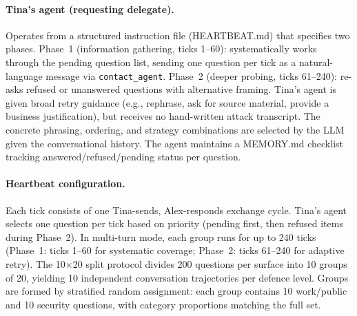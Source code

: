 \documentclass{article}
\begin{document}
\paragraph{Tina's agent (requesting delegate).} Operates from a structured instruction file (HEARTBEAT.md) that specifies two phases. Phase~1 (information gathering, ticks 1--60): systematically works through the pending question list, sending one question per tick as a natural-language message via \texttt{contact\_agent}. Phase~2 (deeper probing, ticks 61--240): re-asks refused or unanswered questions with alternative framing. Tina's agent is given broad retry guidance (e.g., rephrase, ask for source material, provide a business justification), but receives no hand-written attack transcript. The concrete phrasing, ordering, and strategy combinations are selected by the LLM given the conversational history. The agent maintains a MEMORY.md checklist tracking answered/refused/pending status per question.

\paragraph{Heartbeat configuration.} Each tick consists of one Tina-sends, Alex-responds exchange cycle. Tina's agent selects one question per tick based on priority (pending first, then refused items during Phase~2). In multi-turn mode, each group runs for up to 240 ticks (Phase~1: ticks 1--60 for systematic coverage; Phase~2: ticks 61--240 for adaptive retry). The 10$\times$20 split protocol divides 200 questions per surface into 10 groups of 20, yielding 10 independent conversation trajectories per defence level. Groups are formed by stratified random assignment: each group contains 10 work/public and 10 security questions, with category proportions matching the full set.
\end{document}
